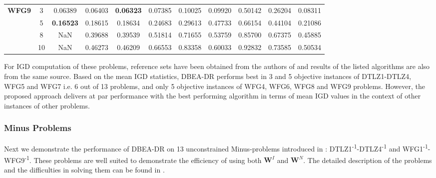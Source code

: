 \documentclass[conference]{IEEEtran}
\begin{document}
\begin{table*}[!htb]
\begin{tabular}{|c|c|c|c|c|c|c|c|c|c|c|}
		\multirow{4}{*}{\textbf{WFG9}}  & 3          & 0.06389          & 0.06403           & \textbf{0.06323}      & 0.07385          & 0.10025             & 0.09920             & 0.50142            & 0.26204              & 0.08311          \\ \cline{2-11} 
		& 5          & \textbf{0.16523} & 0.18615           & 0.18634               & 0.24683          & 0.29613             & 0.47733             & 0.66154            & 0.44104              & 0.21086          \\ \cline{2-11} 
		& 8          & NaN              & 0.39688           & 0.39539               & 0.51814          & 0.71655             & 0.53759             & 0.85700            & 0.67375              & 0.45885          \\ \cline{2-11} 
		& 10         & NaN              & 0.46273           & 0.46209               & 0.66553          & 0.83358             & 0.60033             & 0.92832            & 0.73585              & 0.50534          \\ \hline
	\end{tabular}
\end{table*} 

For IGD computation of these problems, reference sets have been obtained from the authors of \cite{ishibuchi2016inverse} and results of the listed algorithms are also from the same source\cite{ishibuchi2016inverse}. Based on the mean IGD statistics, DBEA-DR performs best in 3 and 5 objective instances of DTLZ1-DTLZ4, WFG5 and WFG7 i.e. 6 out of 13 problems, and only 5 objective instances of WFG4, WFG6, WFG8 and WFG9 problems. However, the proposed approach delivers at par performance with the best performing algorithm in terms of mean IGD values in the context of other instances of other problems. 
 
\subsubsection{Minus Problems}

Next we demonstrate the performance of DBEA-DR on 13 unconstrained Minus-problems introduced in \cite{ishibuchi2016inverse}: DTLZ1\textsuperscript{-1}-DTLZ4\textsuperscript{-1} and WFG1\textsuperscript{-1}-WFG9\textsuperscript{-1}. These problems are well suited to demonstrate the efficiency of using both $\mathbf{W}^I$ and $\mathbf{W}^N$. The detailed description of the problems and the difficulties in solving them can be found in \cite{ishibuchi2016inverse}.  
\end{document}
